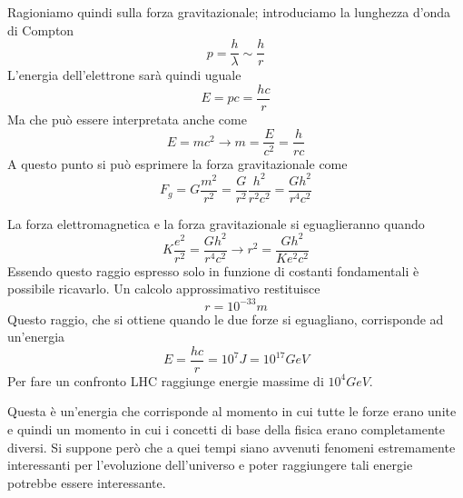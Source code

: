 Ragioniamo quindi sulla forza gravitazionale; introduciamo la lunghezza d'onda di Compton
\begin{equation}
p=\frac{h}{\lambda}\sim \frac{h}{r}
\end{equation}
L'energia dell'elettrone sarà quindi uguale
\begin{equation}
E=pc=\frac{hc}{r}
\end{equation}
Ma che può essere interpretata anche come
\begin{equation}
E=mc^2\to m=\frac{E}{c^2}=\frac{h}{rc}
\end{equation}
A questo punto si può esprimere la forza gravitazionale come 
\begin{equation}
F_g=G\frac{m^2}{r^2}=\frac{G}{r^2}\frac{h^2}{r^2c^2}=\frac{Gh^2}{r^4c^2}
\end{equation}

La forza elettromagnetica e la forza gravitazionale si eguaglieranno quando
\begin{equation}
K\frac{e^2}{r^2}=\frac{Gh^2}{r^4c^2}\longrightarrow r^2=\frac{Gh^2}{Ke^2c^2}
\end{equation}
Essendo questo raggio espresso solo in funzione di costanti fondamentali è possibile ricavarlo.
Un calcolo approssimativo restituisce
\begin{equation}
r=10^{-33}m
\end{equation}
Questo raggio, che si ottiene quando le due forze si eguagliano, corrisponde ad un'energia 
\begin{equation}
E=\frac{hc}{r}=10^7J=10^{17}GeV
\end{equation}
Per fare un confronto LHC raggiunge energie massime di $10^4GeV$.

Questa è un'energia che corrisponde al momento in cui tutte le forze erano unite e quindi un momento in cui i concetti di base della fisica erano completamente diversi.
Si suppone però che a quei tempi siano avvenuti fenomeni estremamente interessanti per l'evoluzione dell'universo e poter raggiungere tali energie potrebbe essere interessante.




